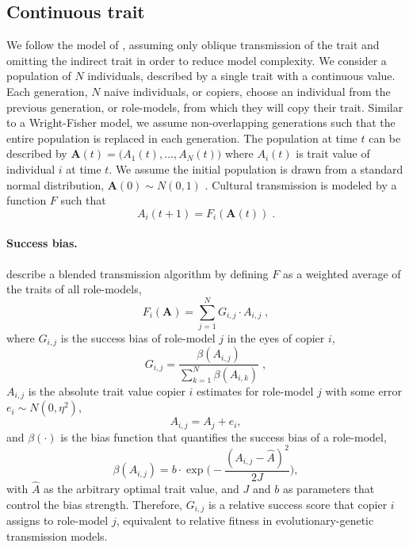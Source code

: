 \documentclass[12pt]{extarticle}
\let\vec\mathbf
\begin{document}
\subsection{Continuous trait}
We follow the model of \citet{evolutionBook}, assuming only oblique transmission of the trait and omitting the indirect trait in order to reduce model complexity. 
We consider a population of $N$ individuals, described by a single trait with a continuous value.
Each generation, $N$ naive individuals, or copiers, choose an individual from the previous generation, or role-models, from which they will copy their trait. Similar to a Wright-Fisher model, we assume non-overlapping generations such that the entire population is replaced in each generation.
The population at time $t$ can be described by $\vec{A}(t)=\big(A_{1}(t), \ldots, A_{N}(t)\big)$ where $A_{i}(t)$ is trait value of individual $i$ at time $t$. We assume the initial population is drawn from a standard normal distribution, $\vec{A}(0) \sim N(0,1)$ .
Cultural transmission is modeled by a function $F$ such that 
\begin{equation}\label{eq:transmission}
A_{i}(t+1) = F_i(\vec{A}(t)) \;.
\end{equation}

\paragraph{Success bias.}
\citet[Ch.~8, p.~247-249]{evolutionBook} describe a blended transmission algorithm by defining $F$ as a weighted average of the traits of all role-models, 
\begin{equation}\label{eq:boydF}
F_i(\vec{A}) = \sum_{j=1}^N G_{i,j}\cdot A_{i,j} \;, 
\end{equation}
where $G_{i,j}$ is the success bias of role-model $j$ in the eyes of copier $i$,
\begin{equation}\label{eq:boydG}
G_{i,j} = \frac{\beta(A_{i,j})}{\sum_{k=1}^{N} \beta(A_{i,k})} \;,
\end{equation}
$A_{i,j}$ is the absolute trait value copier $i$ estimates for role-model $j$ with some error $e_i \sim N(0,\eta^2)$,
\begin{equation}\label{eq:relativeTrait}
A_{i,j} = A_j + e_i,
\end{equation}
and $\beta(\cdot)$ is the bias function that quantifies the success bias of a role-model,
\begin{equation}\label{eq:success_bias}
\beta(A_{i,j}) = b \cdot \exp{\Big(-\frac{(A_{i,j} - \hat{A})^2}{2J}\Big)},
\end{equation} 
with $\hat{A}$ as the arbitrary optimal trait value, and $J$ and $b$ as parameters that control the bias strength.
Therefore, $G_{i,j}$ is a relative success score that copier $i$ assigns to role-model $j$, equivalent to relative fitness in evolutionary-genetic transmission models.
\end{document}
